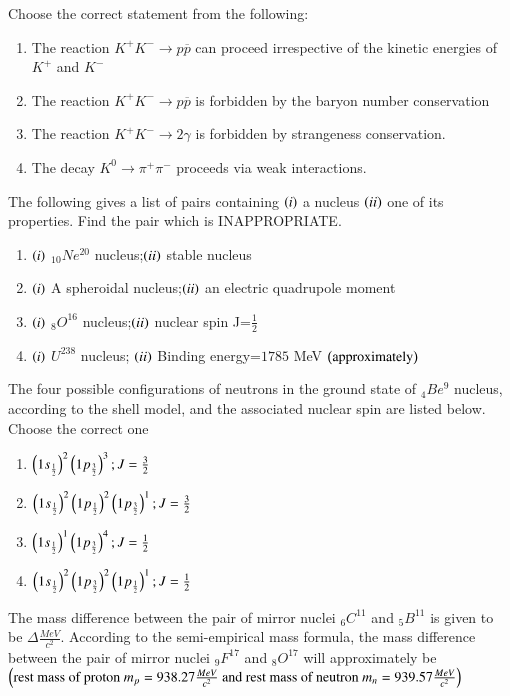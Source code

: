 \documentclass[journal]{IEEEtran}
\begin{document}
\begin{enumerate}
{{}
\item{
Choose the correct statement from the following:
\begin{enumerate}
\item The reaction $K^+K^-\rightarrow p\overline{p}$ can proceed irrespective of the kinetic energies of $K^+$ and $K^-$
\item The reaction $K^+K^-\rightarrow p\overline{p}$ is forbidden by the baryon number conservation
\item The reaction $K^+K^-\rightarrow 2\gamma$ is forbidden by strangeness conservation.
\item The decay $K^0\rightarrow\pi^+\pi^-$ proceeds via weak interactions.
\end{enumerate}
}
\item{
The following gives a list of pairs containing $\left(i\right)$ a nucleus $\left(ii\right)$ one of its properties. Find the pair which is INAPPROPRIATE.
\begin{enumerate}
\item $\left(i\right)$ $_{10}Ne^{20}$ nucleus;$\left(ii\right)$ stable nucleus 
\item $\left(i\right)$ A spheroidal nucleus;$\left(ii\right)$ an electric quadrupole moment
\item $\left(i\right)$ $_8O^{16}$ nucleus;$\left(ii\right)$ nuclear spin J=$\frac{1}{2}$
\item $\left(i\right)$ $U^{238}$ nucleus; $\left(ii\right)$ Binding energy=$1785$ MeV $\left(\text{approximately}\right)$
\end{enumerate}
}
\item{
The four possible configurations of neutrons in the ground state of $_4Be^9$ nucleus, according to the shell model, and the associated nuclear spin are listed below. Choose the correct one
\begin{multicols}{2}
\begin{enumerate}
\item $\left(1s_\frac{1}{2}\right)^2\left(1p_\frac{3}{2}\right)^3;J=\frac{3}{2}$
\item $\left(1s_\frac{1}{2}\right)^2\left(1p_\frac{1}{2}\right)^2\left(1p_\frac{3}{2}\right)^1;J=\frac{3}{2}$
\item $\left(1s_\frac{1}{2}\right)^1\left(1p_\frac{3}{2}\right)^4;J=\frac{1}{2}$
\item $\left(1s_\frac{1}{2}\right)^2\left(1p_\frac{3}{2}\right)^2\left(1p_\frac{1}{2}\right)^1;J=\frac{1}{2}$
\end{enumerate}
\end{multicols}
}
\item{
The mass difference between the pair of mirror nuclei $_6C^11$ and $_5B^{11}$ is given to be $\Delta\frac{MeV}{c^2}$. According to the semi-empirical mass formula, the mass difference between the pair of mirror nuclei $_9F^{17}$ and $_8O^{17}$ will approximately be $\left(\text{rest mass of proton }m_p=938.27\frac{MeV}{c^2}\text{ and rest mass of neutron }m_n=939.57\frac{MeV}{c^2}\right)$
}}
\end{enumerate}
\end{document}
